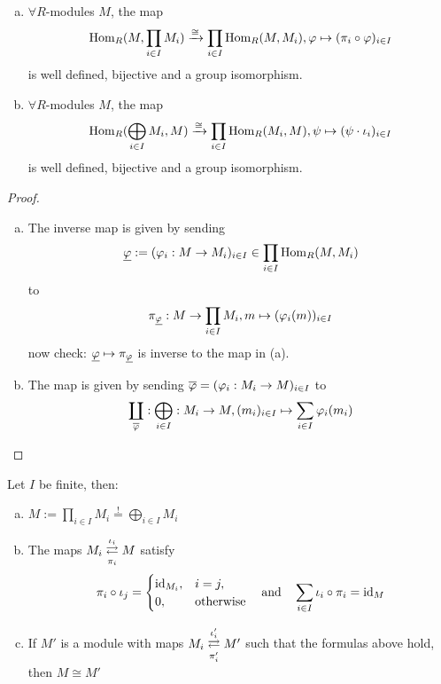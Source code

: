 \documentclass[a4paper]{report}
\begin{document}
\begin{thm}
\begin{enumerate}[(a)]
        \item $\forall R$-modules $M$, the map
        \[\operatorname{Hom}_{R}(M, \prod_{i \in I}M_{i}) \xrightarrow{\cong} \prod_{i \in I} \operatorname{Hom}_{R}(M, M_{i}), \varphi \mapsto (\pi_{i} \circ \varphi)_{i \in I}\]is well defined, bijective and a group isomorphism.
        \item $\forall R$-modules $M$, the map
        \[\operatorname{Hom}_{R}(\bigoplus_{i \in I}M_{i}, M) \xrightarrow{\cong} \prod_{i \in I} \operatorname{Hom}_{R}(M_{i}, M), \psi \mapsto (\psi \cdot \iota_{i})_{i \in I}\]is well defined, bijective and a group isomorphism.
\end{enumerate}
\begin{proof}
  \begin{enumerate}[(a)]
    \item The inverse map is given by sending \[\underline {\varphi}:= (\varphi_{i}: M \to M_{i})_{i \in I} \in \prod_{i \in I}\operatorname{Hom}_{R}(M, M_{i})\]
          to \[\pi_{\underline {\varphi}} : M \to \prod_{i \in I}M_{i}, m \mapsto (\varphi_{i}(m))_{i \in I}\]
          now check: $\underline {\varphi} \mapsto \pi_{\underline {\varphi}}$ is inverse to the map in (a).
    \item The map is given by sending $\overline {\varphi} = (\varphi_{i} : M _{i} \to M)_{i \in I}$ to
          \[\coprod_{\overline {\varphi}} : \bigoplus_{i \in I}: M_{i} \to M, (m_{i})_{i \in I} \mapsto \sum_{i \in I} \varphi_{i}(m_{i})\]
  \end{enumerate}
\end{proof}
\end{thm}

\begin{cor}
  Let $I$ be finite, then:
  \begin{enumerate}[(a)]
    \item $M := \prod_{i \in I} M_{i} \overset != \bigoplus_{i \in I}M_{i}$
    \item The maps $M_{i} \overunderset {\iota_{i}}{\pi_{i}}\rightleftarrows M$ satisfy \[\pi_{i} \circ \iota_{j} = \begin{cases} \operatorname{id}_{M_{i}},& i = j, \\ 0, &\text{otherwise}\end{cases}\quad \text{and}\quad \sum_{i \in I}\iota_{i} \circ \pi_{i} = \operatorname{id}_{M}\]
          \item If $M'$ is a module with maps $M_{i} \overunderset {\iota_{i}'}{\pi_{i}'}\rightleftarrows M'$ such that the formulas above hold, then $M \cong M'$
  \end{enumerate}
\end{cor}



\end{document}
